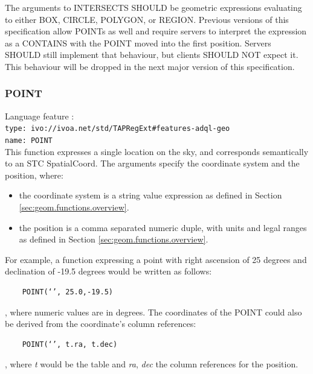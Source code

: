 \documentclass[11pt,a4paper]{ivoa}
\begin{document}
The arguments to INTERSECTS SHOULD be geometric expressions evaluating to
either BOX, CIRCLE, POLYGON, or REGION. Previous versions of this
specification allow POINTs as well and require servers to interpret the
expression as a CONTAINS with the POINT moved into the first position. Servers
SHOULD still implement that behaviour, but clients SHOULD NOT expect it. This
behaviour will be dropped in the next major version of this specification.

\subsubsection{POINT}
\label{sec:geom.functions.point}
{\footnotesize Language feature :}\\
{\footnotesize \verb|type: ivo://ivoa.net/std/TAPRegExt#features-adql-geo|}\\
{\footnotesize \verb|name: POINT|}\\

This function expresses a single location on the sky, and corresponds
semantically to an STC SpatialCoord. The arguments
specify the coordinate system and the position, where:

\begin{itemize}
    \item the coordinate system is a string value expression as defined in Section \ref{sec:geom.functions.overview}.
    \item the position is a comma separated numeric duple, with units and legal ranges as defined in Section \ref{sec:geom.functions.overview}.
\end{itemize}

For example, a function expressing a point with right ascension of 25 degrees
and declination of -19.5 degrees would be written as follows:

\begin{verbatim}
    POINT(‘’, 25.0,-19.5)
\end{verbatim}

, where numeric values are in degrees. The coordinates of the POINT could
also be derived from the coordinate’s column references:

\begin{verbatim}
    POINT(‘’, t.ra, t.dec)
\end{verbatim}
    
, where \textit{t} would be the table and \textit{ra}, \textit{dec} the
column references for the position.
\end{document}
